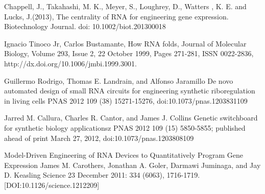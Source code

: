 \documentclass[11pt]{article}
\begin{document}
\newpage
  
\begin{thebibliography}{9}

Chappell, J., Takahashi, M. K., Meyer, S., Loughrey, D., Watters
  , K. E. and Lucks, J.(2013), 
  The centrality of RNA for engineering gene expression. 
  Biotechnology Journal. doi: 10.1002/biot.201300018

Ignacio Tinoco Jr, Carlos Bustamante, How RNA folds, 
  Journal of Molecular Biology, Volume 293, Issue 2, 22 October 1999, 
  Pages 271-281, ISSN 0022-2836, http://dx.doi.org/10.1006/jmbi.1999.3001.

Guillermo Rodrigo, Thomas E. Landrain, and Alfonso Jaramillo
  De novo automated design of small RNA circuits for engineering synthetic riboregulation in living cells
  PNAS 2012 109 (38) 15271-15276, doi:10.1073/pnas.1203831109

Jarred M. Callura, Charles R. Cantor, and James J. Collins
  Genetic switchboard for synthetic biology applicationsz
  PNAS 2012 109 (15) 5850-5855; published ahead of print March 27, 2012, doi:10.1073/pnas.1203808109

Model-Driven Engineering of RNA Devices to Quantitatively Program Gene Expression
    James M. Carothers, Jonathan A. Goler, Darmawi Juminaga, and Jay D. Keasling
    Science 23 December 2011: 334 (6063), 1716-1719. [DOI:10.1126/science.1212209]


\end{thebibliography}
\end{document}
